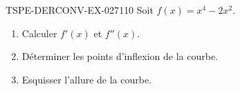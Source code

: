\begin{exercice}{TSPE-DERCONV-EX-027}{1}{10}
Soit $f(x) = x^4 - 2x^2$.
\begin{enumerate}
  \item Calculer $f'(x)$ et $f''(x)$.
  \item Déterminer les points d'inflexion de la courbe.
  \item Esquisser l'allure de la courbe.
\end{enumerate}

\end{exercice}
